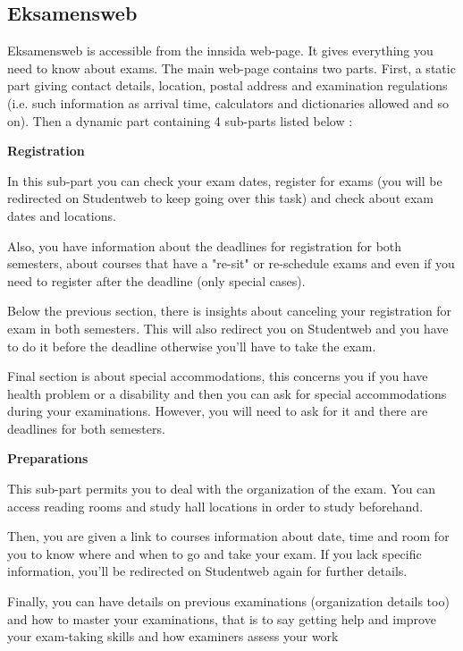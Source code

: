 \subsection{Eksamensweb}

Eksamensweb is accessible from the innsida web-page. It gives everything you need to know about 
exams. The main web-page contains two parts. First, a static part giving contact details, location, 
postal address and examination regulations (i.e. such information as arrival time, calculators and 
dictionaries allowed and so on). Then a dynamic part containing 4 sub-parts listed below :

{\small{\textbf{Registration}}}

In this sub-part you can check your exam dates, register for exams (you will be redirected on 
Studentweb to keep going over this task) and check about exam dates and locations.
\par
Also, you have information about the deadlines for registration for both semesters, about 
courses that have a "re-sit" or re-schedule exams and even if you need to register after the 
deadline (only special cases).
\par
Below the previous section, there is insights about canceling your registration for exam in 
both semesters. This will also redirect you on Studentweb and you have to do it before the deadline otherwise you'll have to take the exam.
\par
Final section is about special accommodations, this concerns you if you have health problem 
or a disability and then you can ask for special accommodations during your examinations. 
However, you will need to ask for it and there are deadlines for both semesters.

{\small{\textbf{Preparations}}}

This sub-part permits you to deal with the organization of the exam. You can access reading 
rooms and study hall locations in order to study beforehand.
\par
Then, you are given a link to courses information about date, time and room for you to know 
where and when to go and take your exam. If you lack specific information, you'll be 
redirected on Studentweb again for further details.
\par
Finally, you can have details on previous examinations (organization details too) and how to 
master your examinations, that is to say getting help and improve your exam-taking skills and 
how examiners assess your work


